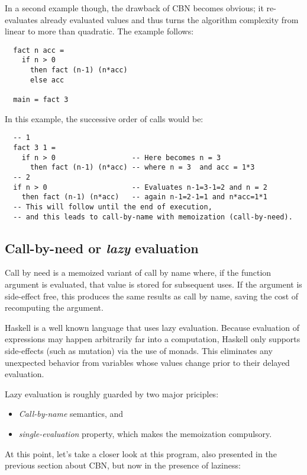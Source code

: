 \documentclass[diploma]{softlab-thesis}
\begin{document}
In a second example though, the drawback of CBN becomes obvious; it re-evaluates already evaluated values and thus 
turns the algorithm complexity from linear to more than quadratic. The example follows:

\begin{verbatim}
  fact n acc = 
    if n > 0 
      then fact (n-1) (n*acc)
      else acc

  main = fact 3
\end{verbatim}

In this example, the successive order of calls would be:
\begin{verbatim}
  -- 1 
  fact 3 1 = 
    if n > 0                  -- Here becomes n = 3
      then fact (n-1) (n*acc) -- where n = 3  and acc = 1*3
  -- 2
  if n > 0                    -- Evaluates n-1=3-1=2 and n = 2 
    then fact (n-1) (n*acc)   -- again n-1=2-1=1 and n*acc=1*1
  -- This will follow until the end of execution, 
  -- and this leads to call-by-name with memoization (call-by-need).
\end{verbatim}


\subsection {Call-by-need or \textit{lazy} evaluation }
\label{sec:lazy}

Call by need is a memoized variant of call by name where, if the function argument is evaluated, 
that value is stored for subsequent uses. If the argument is side-effect free, this produces the same results as call by name, 
saving the cost of recomputing the argument. 

Haskell is a well known language that uses lazy evaluation. Because evaluation of expressions may happen arbitrarily 
far into a computation, Haskell only supports side-effects (such as mutation) via the use of monads. This eliminates any 
unexpected behavior from variables whose values change prior to their delayed evaluation.

Lazy evaluation is roughly guarded by two major priciples:
\begin{itemize}
  \item \textit{Call-by-name} semantics, and
  \item \textit{single-evaluation} property, which makes the memoization compulsory.
\end{itemize}

At this point, let's take a closer look at this program, also presented in the previous section about CBN,
but now in the presence of laziness:
\end{document}
